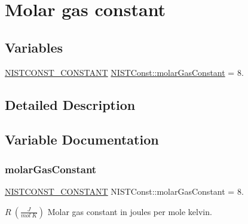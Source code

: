\hypertarget{group___n_i_s_t_const-_molar_gas_constant}{}\section{Molar gas constant}
\label{group___n_i_s_t_const-_molar_gas_constant}
\subsection*{Variables}
\begin{DoxyCompactItemize}
\item 
\mbox{\hyperlink{_n_i_s_t_const_8hpp_a2b0fc1d7452373f816175dd86ce26729}{N\+I\+S\+T\+C\+O\+N\+S\+T\+\_\+\+C\+O\+N\+S\+T\+A\+NT}} \mbox{\hyperlink{group___n_i_s_t_const-_molar_gas_constant_gac728faac7d754d8ddca4a4bd7565ec0e}{N\+I\+S\+T\+Const\+::molar\+Gas\+Constant}} = 8.
\end{DoxyCompactItemize}


\subsection{Detailed Description}


\subsection{Variable Documentation}
\mbox{\label{group___n_i_s_t_const-_molar_gas_constant_gac728faac7d754d8ddca4a4bd7565ec0e}} 
\subsubsection{\texorpdfstring{molar\+Gas\+Constant}{molarGasConstant}}
{\footnotesize\ttfamily \mbox{\hyperlink{_n_i_s_t_const_8hpp_a2b0fc1d7452373f816175dd86ce26729}{N\+I\+S\+T\+C\+O\+N\+S\+T\+\_\+\+C\+O\+N\+S\+T\+A\+NT}} N\+I\+S\+T\+Const\+::molar\+Gas\+Constant = 8.}

$R \ (\frac{J}{mol\ K})$ Molar gas constant in joules per mole kelvin. 
